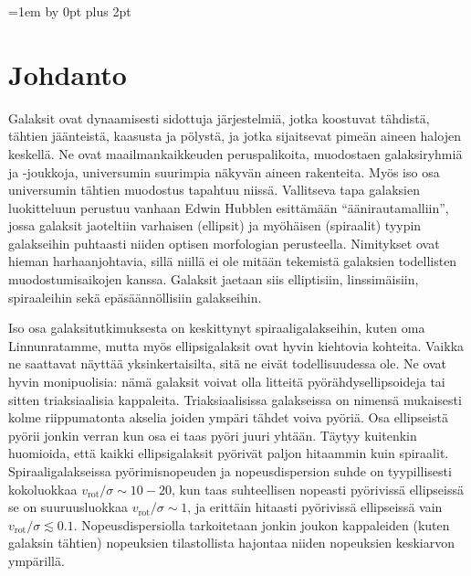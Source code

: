 \documentclass[12pt,a4paper]{article}
\begin{document}




\newpage
\tableofcontents
\thispagestyle{empty}
\newpage
\setcounter{page}{1}
\parskip=1em \advance\parskip by 0pt plus 2pt
\pagestyle{fancy}
\cfoot{\thepage}

\section{Johdanto}

Galaksit ovat dynaamisesti sidottuja järjestelmiä, jotka koostuvat tähdistä, tähtien jään\-teistä, kaasusta ja pölystä, ja jotka sijaitsevat pimeän aineen halojen keskellä. Ne ovat maailmankaikkeuden peruspalikoita, muodostaen galaksiryhmiä ja -joukkoja, universumin suurimpia näkyvän aineen rakenteita. Myös iso osa universumin tähtien muodostus tapahtuu niissä. Vallitseva tapa galaksien luokitteluun perustuu vanhaan Edwin Hubblen esittämään ``äänirautamalliin'', jossa galaksit jaoteltiin varhaisen (ellipsit) ja myöhäisen (spiraalit) tyypin galakseihin puhtaasti niiden optisen morfologian perusteella. Nimitykset ovat hieman harhaanjohtavia, sillä niillä ei ole mitään tekemistä galaksien todellisten muodostumisaikojen kanssa. Galaksit jaetaan siis elliptisiin, linssimäisiin, spiraaleihin sekä epäsäännöllisiin galakseihin. 

Iso osa galaksitutkimuksesta on keskittynyt spiraaligalakseihin, kuten oma Linnunratamme, mutta myös ellipsigalaksit ovat hyvin kiehtovia kohteita. Vaikka ne saattavat näyttää yksinkertaisilta, sitä ne eivät todellisuudessa ole. Ne ovat hyvin monipuolisia: nämä galaksit voivat olla litteitä pyörähdysellipsoideja tai sitten triaksiaalisia kappaleita. Triaksiaalisissa galakseissa on nimensä mukaisesti kolme riippumatonta akselia joiden ympäri tähdet voiva pyöriä. Osa ellipseistä pyörii jonkin verran kun osa ei taas pyöri juuri yhtään. Täytyy kuitenkin huomioida, että kaikki ellipsigalaksit pyörivät paljon hitaammin kuin spiraalit. Spiraaligalakseissa pyörimisnopeuden ja nopeusdispersion suhde on tyypillisesti kokoluokkaa $v_\mathrm{rot} / \sigma \sim 10-20$, kun taas suhteellisen nopeasti pyörivissä ellipseissä se on suuruusluokkaa  $v_\mathrm{rot} / \sigma \sim 1$, ja erittäin hitaasti pyörivissä ellipseissä vain $v_\mathrm{rot} / \sigma \lesssim 0.1$. Nopeusdispersiolla tarkoitetaan jonkin joukon kappaleiden (kuten galaksin tähtien) nopeuksien tilastollista hajontaa niiden nopeuksien keskiarvon ympärillä.
\end{document}
